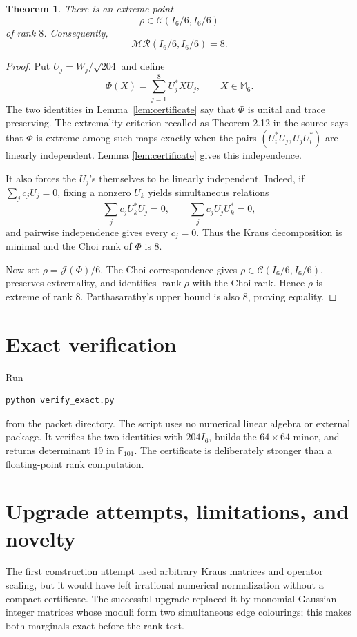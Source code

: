 \documentclass[11pt]{article}
\newtheorem{theorem}{Theorem}
\theoremstyle{remark}
\newcommand{\M}{\mathbb M}
\newcommand{\MR}{\mathcal{MR}}
\newcommand{\J}{\mathcal J}
\newcommand{\rank}{\operatorname{rank}}
\begin{document}
\begin{theorem}\label{thm:main}
There is an extreme point
\[
 \rho\in\mathcal C(I_6/6,I_6/6)
\]
of rank \(8\).  Consequently,
\[
 \boxed{\MR(I_6/6,I_6/6)=8.}
\]
\end{theorem}

\begin{proof}
Put \(U_j=W_j/\sqrt{204}\) and define
\[
 \Phi(X)=\sum_{j=1}^8U_j^*XU_j,\qquad X\in\M_6.
\]
The two identities in Lemma~\ref{lem:certificate} say that \(\Phi\) is
unital and trace preserving.  The extremality criterion recalled as
Theorem 2.12 in the source says that \(\Phi\) is extreme among such maps
exactly when the pairs
\((U_i^*U_j,U_jU_i^*)\) are linearly independent.  Lemma
\ref{lem:certificate} gives this independence.

It also forces the \(U_j\)'s themselves to be linearly independent.  Indeed,
if \(\sum_jc_jU_j=0\), fixing a nonzero \(U_k\) yields simultaneous
relations
\[
 \sum_jc_jU_k^*U_j=0,\qquad
 \sum_jc_jU_jU_k^*=0,
\]
and pairwise independence gives every \(c_j=0\).  Thus the Kraus
decomposition is minimal and the Choi rank of \(\Phi\) is \(8\).

Now set \(\rho=\J(\Phi)/6\).  The Choi correspondence gives
\(\rho\in\mathcal C(I_6/6,I_6/6)\), preserves extremality, and identifies
\(\rank\rho\) with the Choi rank.  Hence \(\rho\) is extreme of rank \(8\).
Parthasarathy's upper bound is also \(8\), proving equality.
\end{proof}

\section{Exact verification}

Run
\begin{verbatim}
python verify_exact.py
\end{verbatim}
from the packet directory.  The script uses no numerical linear algebra or
external package.  It verifies the two identities with \(204I_6\), builds
the \(64\times64\) minor, and returns determinant \(19\) in
\(\mathbb F_{101}\).  The certificate is deliberately stronger than a
floating-point rank computation.

\section{Upgrade attempts, limitations, and novelty}

The first construction attempt used arbitrary Kraus matrices and operator
scaling, but it would have left irrational numerical normalization without
a compact certificate.  The successful upgrade replaced it by monomial
Gaussian-integer matrices whose moduli form two simultaneous edge colourings;
this makes both marginals exact before the rank test.
\end{document}
